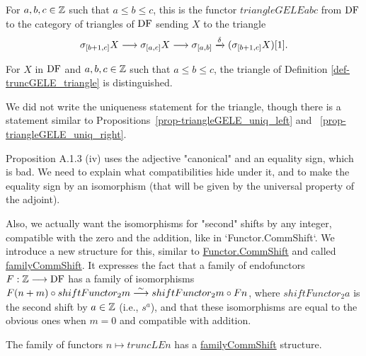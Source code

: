 \begin{definition}
\label{def-truncGELE_triangle}
\leanok
{}

For $a,b,c\in\mathbb{Z}$ such that $a\le b\le c$,
this is the functor $triangleGELE a b c$ from $\operatorname{DF}$ to the category of triangles of $\operatorname{DF}$ sending $X$ to the triangle 
\[\sigma_{[b+1,c]} X \longrightarrow \sigma_{[a,c]} X \longrightarrow \sigma_{[a,b]} \xrightarrow{\delta} (\sigma_{[b+1,c]} X)[1].\]

\end{definition}

\begin{proposition}
\label{def-truncGELE_triangle_dist}
\leanok
{}
For $X$ in $\operatorname{DF}$ and $a,b,c\in\mathbb{Z}$ such that $a\le b\le c$, the triangle of Definition \ref{def-truncGELE_triangle}
is distinguished.

\end{proposition}

We did not write the uniqueness statement for the triangle, though there is a statement similar to 
Propositions~\ref{prop-triangleGELE_uniq_left} and ~\ref{prop-triangleGELE_uniq_right}.

Proposition A.1.3 (iv) uses the adjective "canonical" and an equality sign, which is bad. We need to explain what 
compatibilities hide under it, and to make the equality sign by an isomorphism 
(that will be given by the universal property of the adjoint).

Also, we actually want the isomorphisms for "second" shifts
by any integer, compatible with the zero and the addition, like in `Functor.CommShift`.
We introduce a new structure for this, similar to \url{Functor.CommShift} and called
\url{familyCommShift}. It expresses the fact that a family of endofunctors $F: \mathbb{Z} \longrightarrow\operatorname{DF}$ has a family of 
isomorphisms $F (n + m) \circ shiftFunctor_2 m \stackrel{\sim}{\longrightarrow} shiftFunctor_2 m \circ F n$, where $shiftFunctor_2 a$ is the
second shift by $a\in\mathbb{Z}$ (i.e., $s^a$), and that these isomorphisms are equal to the obvious ones when $m=0$ and 
compatible with addition.

\begin{definition}
\label{def-truncLE_commShift}
\leanok
{}

The family of functors $n \mapsto truncLE n$ has a \url{familyCommShift} structure.

\end{definition}

